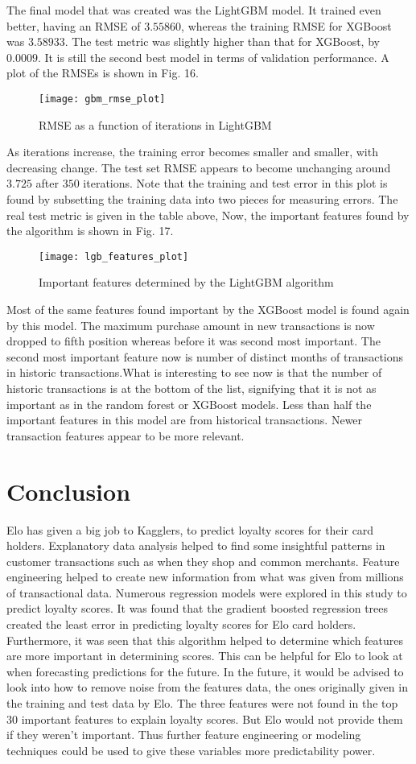 \documentclass[journal, a4paper]{IEEEtran}
\begin{document}
The final model that was created was the LightGBM model. It trained even better, having an RMSE of $3.55860$, whereas the training RMSE for XGBoost was $3.58933$. The test metric was slightly higher than that for XGBoost, by $0.0009$. It is still the second best model in terms of validation performance. A plot of the RMSEs is shown in Fig. 16. \begin{figure}[t] \texttt{[image: gbm\_rmse\_plot]} \caption{RMSE as a function of iterations in LightGBM} \end{figure} As iterations increase, the training error becomes smaller and smaller, with decreasing change. The test set RMSE appears to become unchanging around $3.725$ after $350$ iterations. Note that the training and test error in this plot is found by subsetting the training data into two pieces for measuring errors. The real test metric is given in the table above, Now, the important features found by the algorithm is shown in Fig. 17. \begin{figure}[t] \texttt{[image: lgb\_features\_plot]} \caption{Important features determined by the LightGBM algorithm} \end{figure} Most of the same features found important by the XGBoost model is found again by this model. The maximum purchase amount in new transactions is now dropped to fifth position whereas before it was second most important. The second most important feature now is number of distinct months of transactions in historic transactions.What is interesting to see now is that the number of historic transactions is at the bottom of the list, signifying that it is not as important as in the random forest or XGBoost models. Less than half the important features in this model are from historical transactions. Newer transaction features appear to be more relevant. 

\section{Conclusion}
Elo has given a big job to Kagglers, to predict loyalty scores for their card holders. Explanatory data analysis helped to find some insightful patterns in customer transactions such as when they shop and common merchants. Feature engineering helped to create new information from what was given from millions of transactional data. Numerous regression models were explored in this study to predict loyalty scores. It was found that the gradient boosted regression trees created the least error in predicting loyalty scores for Elo card holders. Furthermore, it was seen that this algorithm helped to determine which features are more important in determining scores. This can be helpful for Elo to look at when forecasting predictions for the future. In the future, it would be advised to look into how to remove noise from the features data, the ones originally given in the training and test data by Elo. The three features were not found in the top $30$ important features to explain loyalty scores. But Elo would not provide them if they weren't important. Thus further feature engineering or modeling techniques could be used to give these variables more predictability power. 
\end{document}
